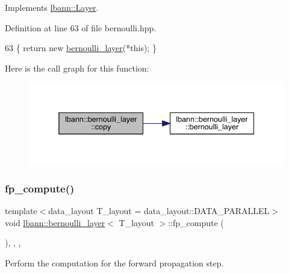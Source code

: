 Implements \hyperlink{classlbann_1_1Layer_af420f22bbac801c85483ade84588a23f}{lbann\+::\+Layer}.



Definition at line 63 of file bernoulli.\+hpp.


\begin{DoxyCode}
63 \{ \textcolor{keywordflow}{return} \textcolor{keyword}{new} \hyperlink{classlbann_1_1bernoulli__layer_a59ea36ca262436f918f06cf3ea43d999}{bernoulli\_layer}(*\textcolor{keyword}{this}); \}
\end{DoxyCode}
Here is the call graph for this function\+:\nopagebreak
\begin{figure}[H]
\begin{center}
\leavevmode
\includegraphics[width=338pt]{classlbann_1_1bernoulli__layer_acf1c58e256f8f5c494a15be4537cdb37_cgraph}
\end{center}
\end{figure}
\mbox{\label{classlbann_1_1bernoulli__layer_ad3b8939b6df375880247ef54f370ceb1}} 
\subsubsection{\texorpdfstring{fp\+\_\+compute()}{fp\_compute()}}
{\footnotesize\ttfamily template$<$data\+\_\+layout T\+\_\+layout = data\+\_\+layout\+::\+D\+A\+T\+A\+\_\+\+P\+A\+R\+A\+L\+L\+EL$>$ \\
void \hyperlink{classlbann_1_1bernoulli__layer}{lbann\+::bernoulli\+\_\+layer}$<$ T\+\_\+layout $>$\+::fp\+\_\+compute (\begin{DoxyParamCaption}{ }\end{DoxyParamCaption})\hspace{0.3cm}{\ttfamily [inline]}, {\ttfamily [override]}, {\ttfamily [protected]}, {\ttfamily [virtual]}}

Perform the computation for the forward propagation step. 

